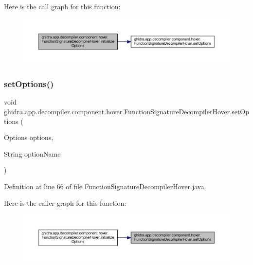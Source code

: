 Here is the call graph for this function\+:
\nopagebreak
\begin{figure}[H]
\begin{center}
\leavevmode
\includegraphics[width=350pt]{classghidra_1_1app_1_1decompiler_1_1component_1_1hover_1_1_function_signature_decompiler_hover_a5acea5a447feb773d46ef4cad16c5cfb_cgraph}
\end{center}
\end{figure}
\mbox{\label{classghidra_1_1app_1_1decompiler_1_1component_1_1hover_1_1_function_signature_decompiler_hover_a9cc0bb6ff1fac001b162655a97429a4f}} 
\subsubsection{\texorpdfstring{setOptions()}{setOptions()}}
{\footnotesize\ttfamily void ghidra.\+app.\+decompiler.\+component.\+hover.\+Function\+Signature\+Decompiler\+Hover.\+set\+Options (\begin{DoxyParamCaption}\item[{Options}]{options,  }\item[{String}]{option\+Name }\end{DoxyParamCaption})\hspace{0.3cm}{\ttfamily [inline]}}



Definition at line 66 of file Function\+Signature\+Decompiler\+Hover.\+java.

Here is the caller graph for this function\+:
\nopagebreak
\begin{figure}[H]
\begin{center}
\leavevmode
\includegraphics[width=350pt]{classghidra_1_1app_1_1decompiler_1_1component_1_1hover_1_1_function_signature_decompiler_hover_a9cc0bb6ff1fac001b162655a97429a4f_icgraph}
\end{center}
\end{figure}


